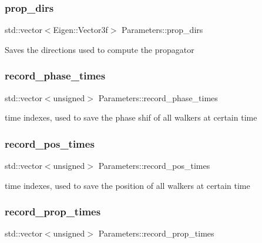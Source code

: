 \subsubsection{\texorpdfstring{prop\+\_\+dirs}{prop\_dirs}}
{\footnotesize\ttfamily std\+::vector$<$Eigen\+::\+Vector3f$>$ Parameters\+::prop\+\_\+dirs}

Saves the directions used to compute the propagator \mbox{\label{class_parameters_a559e66b65a2cb4391d1099bf0db6ec44}} 
\subsubsection{\texorpdfstring{record\+\_\+phase\+\_\+times}{record\_phase\_times}}
{\footnotesize\ttfamily std\+::vector$<$unsigned$>$ Parameters\+::record\+\_\+phase\+\_\+times}

time indexes, used to save the phase shif of all walkers at certain time \mbox{\label{class_parameters_a4f884a7effd3a8816c78084ff3c2b202}} 
\subsubsection{\texorpdfstring{record\+\_\+pos\+\_\+times}{record\_pos\_times}}
{\footnotesize\ttfamily std\+::vector$<$unsigned$>$ Parameters\+::record\+\_\+pos\+\_\+times}

time indexes, used to save the position of all walkers at certain time \mbox{\label{class_parameters_af47bd2eada81c6c581aaa8c70d04c8d6}} 
\subsubsection{\texorpdfstring{record\+\_\+prop\+\_\+times}{record\_prop\_times}}
{\footnotesize\ttfamily std\+::vector$<$unsigned$>$ Parameters\+::record\+\_\+prop\+\_\+times}


